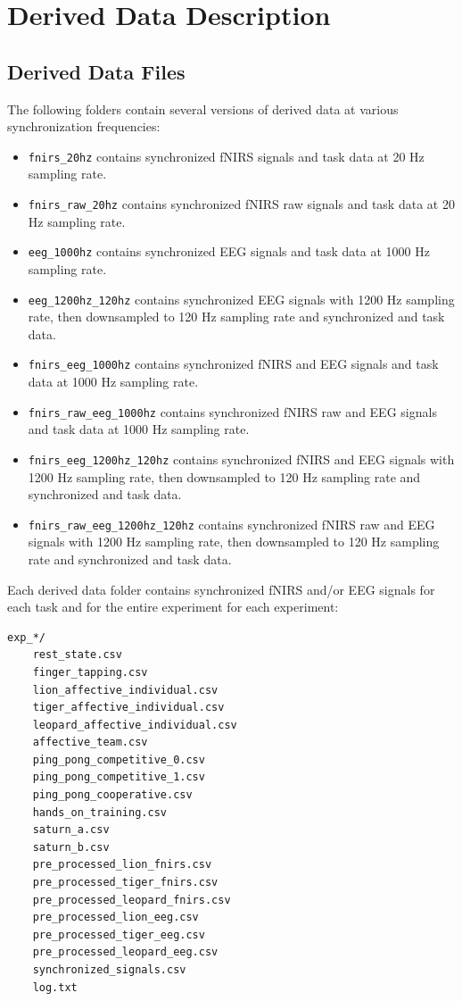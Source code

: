 \section{Derived Data Description}

\subsection{Derived Data Files}

The following folders contain several versions of derived data at various synchronization frequencies:
\begin{itemize}
  \item \texttt{fnirs\_20hz} contains synchronized fNIRS signals and task data at 20 Hz sampling rate.
  \item \texttt{fnirs\_raw\_20hz} contains synchronized fNIRS raw signals and task data at 20 Hz sampling rate.
  \item \texttt{eeg\_1000hz} contains synchronized EEG signals and task data at 1000 Hz sampling rate.
  \item \texttt{eeg\_1200hz\_120hz} contains synchronized EEG signals with 1200 Hz sampling rate, then downsampled to 120 Hz sampling rate and synchronized and task data.
  \item \texttt{fnirs\_eeg\_1000hz} contains synchronized fNIRS and EEG signals and task data at 1000 Hz sampling rate.
  \item \texttt{fnirs\_raw\_eeg\_1000hz} contains synchronized fNIRS raw and EEG signals and task data at 1000 Hz sampling rate.
  \item \texttt{fnirs\_eeg\_1200hz\_120hz} contains synchronized fNIRS and EEG signals with 1200 Hz sampling rate, then downsampled to 120 Hz sampling rate and synchronized and task data.
  \item \texttt{fnirs\_raw\_eeg\_1200hz\_120hz} contains synchronized fNIRS raw and EEG signals with 1200 Hz sampling rate, then downsampled to 120 Hz sampling rate and synchronized and task data.
\end{itemize}

Each derived data folder contains synchronized fNIRS and/or EEG signals for each task and for the entire experiment for each experiment:
\begin{verbatim}
exp_*/
    rest_state.csv
    finger_tapping.csv
    lion_affective_individual.csv
    tiger_affective_individual.csv
    leopard_affective_individual.csv
    affective_team.csv
    ping_pong_competitive_0.csv
    ping_pong_competitive_1.csv
    ping_pong_cooperative.csv
    hands_on_training.csv
    saturn_a.csv
    saturn_b.csv
    pre_processed_lion_fnirs.csv
    pre_processed_tiger_fnirs.csv
    pre_processed_leopard_fnirs.csv
    pre_processed_lion_eeg.csv
    pre_processed_tiger_eeg.csv
    pre_processed_leopard_eeg.csv
    synchronized_signals.csv
    log.txt
\end{verbatim}

